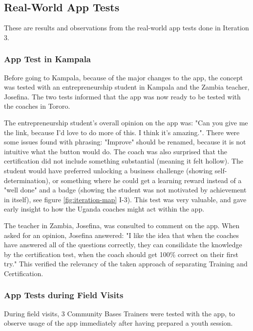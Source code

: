 \subsection{Real-World App Tests}

  These are results and observations from the real-world app tests done in Iteration 3.


  \subsubsection{App Test in Kampala}
  Before going to Kampala, because of the major changes to the app, the concept was tested with an entrepreneurship student in Kampala and the Zambia teacher, Josefina. The two tests informed that the app was now ready to be tested with the coaches in Tororo.

  The entrepreneurship student's overall opinion on the app was: "Can you give me the link, because I'd love to do more of this. I think it's amazing.". There were some issues found with phrasing: "Improve" should be renamed, because it is not intuitive what the button would do. The coach was also surprised that the certification did not include something substantial (meaning it felt hollow). The student would have preferred unlocking a business challenge (showing self-determination), or something where he could get a learning reward instead of a "well done" and a badge (showing the student was not motivated by achievement in itself), see figure \ref{fig:iteration-map} I-3). This test was very valuable, and gave early insight to how the Uganda coaches might act within the app.

  The teacher in Zambia, Josefina, was consulted to comment on the app. When asked for an opinion, Josefina answered: "I like the idea that when the coaches have answered all of the questions correctly, they can consilidate the knowledge by the certification test, when the coach should get 100\% correct on their first try." This verified the relevancy of the taken approach of separating Training and Certification.

  \subsubsection{App Tests during Field Visits}

  During field visits, 3 Community Bases Trainers were tested with the app, to observe usage of the app immediately after having prepared a youth session.

